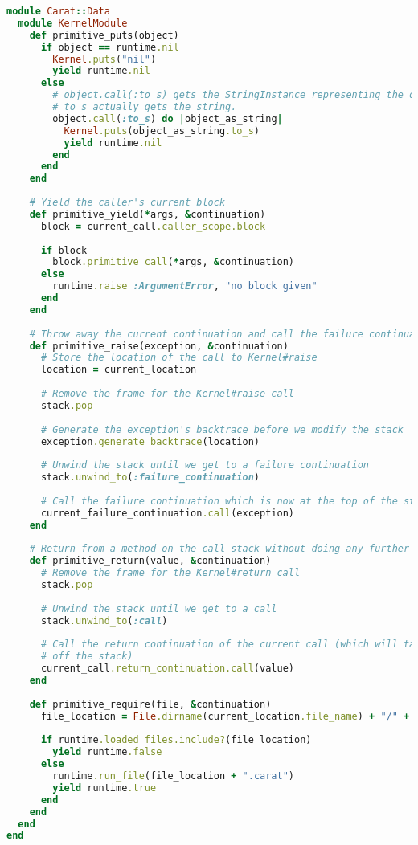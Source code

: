 \begin{lstlisting}[title={\small\Helvetica data/kernel.rb},language=Ruby]
module Carat::Data
  module KernelModule
    def primitive_puts(object)
      if object == runtime.nil
        Kernel.puts("nil")
        yield runtime.nil
      else
        # object.call(:to_s) gets the StringInstance representing the object, and then calling
        # to_s actually gets the string.
        object.call(:to_s) do |object_as_string|
          Kernel.puts(object_as_string.to_s)
          yield runtime.nil
        end
      end
    end
    
    # Yield the caller's current block
    def primitive_yield(*args, &continuation)
      block = current_call.caller_scope.block
      
      if block
        block.primitive_call(*args, &continuation)
      else
        runtime.raise :ArgumentError, "no block given"
      end
    end
    
    # Throw away the current continuation and call the failure continuation
    def primitive_raise(exception, &continuation)
      # Store the location of the call to Kernel#raise
      location = current_location
      
      # Remove the frame for the Kernel#raise call
      stack.pop
      
      # Generate the exception's backtrace before we modify the stack
      exception.generate_backtrace(location)
      
      # Unwind the stack until we get to a failure continuation
      stack.unwind_to(:failure_continuation)
      
      # Call the failure continuation which is now at the top of the stack
      current_failure_continuation.call(exception)
    end
    
    # Return from a method on the call stack without doing any further computation
    def primitive_return(value, &continuation)
      # Remove the frame for the Kernel#return call
      stack.pop
      
      # Unwind the stack until we get to a call
      stack.unwind_to(:call)
      
      # Call the return continuation of the current call (which will take care of popping the call
      # off the stack)
      current_call.return_continuation.call(value)
    end
    
    def primitive_require(file, &continuation)
      file_location = File.dirname(current_location.file_name) + "/" + file.to_s
      
      if runtime.loaded_files.include?(file_location)
        yield runtime.false
      else
        runtime.run_file(file_location + ".carat")
        yield runtime.true
      end
    end
  end
end

\end{lstlisting}
